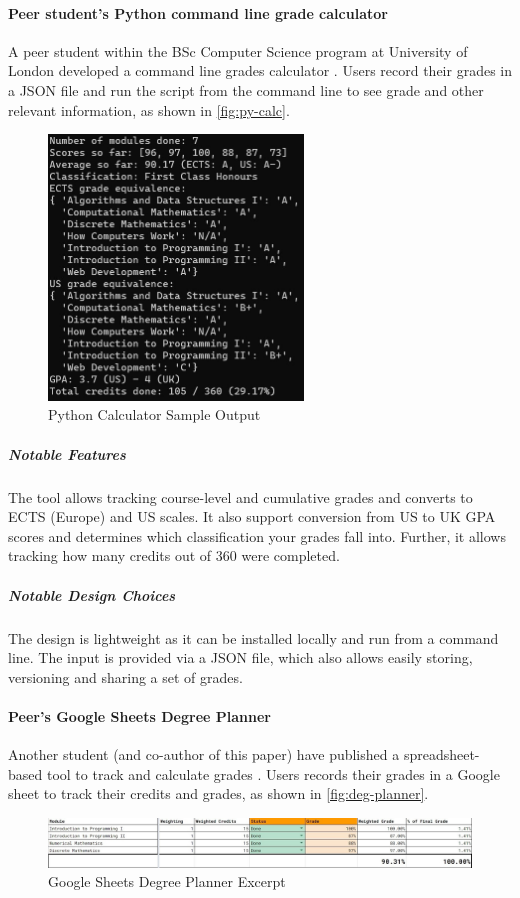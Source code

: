 \paragraph{Peer student's Python command line grade calculator}
A peer student within the BSc Computer Science program at University of London developed a command line grades calculator \cite{lavoie_2020}. Users record their grades in a JSON file and run the script from the command line to see grade and other relevant information, as shown in \autoref{fig:py-calc}.

\begin{figure}[H]
\noindent \includegraphics[height=200pt]{py-example-output.jpg}
\centering
\caption{Python Calculator Sample Output}
\label{fig:py-calc}
\end{figure}

\subparagraph{Notable Features}
The tool allows tracking course-level and cumulative grades and converts to ECTS (Europe) and US scales. It also support conversion from US to UK GPA scores and determines which classification your grades fall into. Further, it allows tracking how many credits out of 360 were completed.

\subparagraph{Notable Design Choices}
The design is lightweight as it can be installed locally and run from a command line. The input is provided via a JSON file, which also allows easily storing, versioning and sharing a set of grades.

\paragraph{Peer's Google Sheets Degree Planner}
Another student (and co-author of this paper) have published a spreadsheet-based tool to track and calculate grades \cite{muralidharan_2020}. Users records their grades in a Google sheet to track their credits and grades, as shown in \autoref{fig:deg-planner}.
\begin{figure}[H]
\noindent \includegraphics[width=\textwidth]{degree-planner-partial}
\centering
\caption{Google Sheets Degree Planner Excerpt}
\label{fig:deg-planner}
\end{figure}

